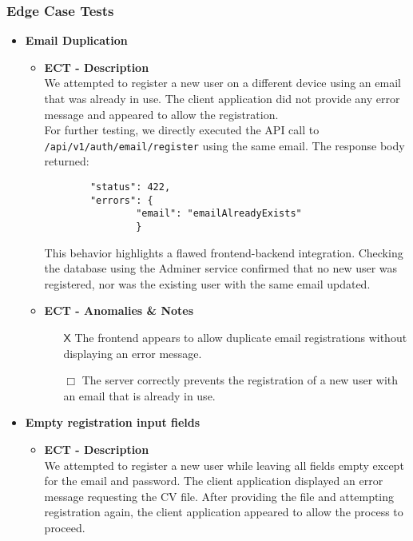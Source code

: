 \subsubsection{Edge Case Tests}
\begin{itemize} [label= {\color{titleColor}\(\diamond\)}]
    \item \textbf{\color{titleColor} Email Duplication }
    \begin{itemize}
        \item \textbf{\color{titleColor} ECT - Description}\\ 
            We attempted to register a new user on a different device using an email that was already in use. The client application did not provide any error message and appeared to allow the registration. \\

            For further testing, we directly executed the API call to \verb|/api/v1/auth/email/register| using the same email. The response body returned:
                \begin{verbatim}
        "status": 422,
        "errors": {
                "email": "emailAlreadyExists"
                }
                \end{verbatim}
            This behavior highlights a flawed frontend-backend integration. Checking the database using the Adminer service confirmed that no new user was registered, nor was the existing user with the same email updated.
            
        \item \textbf{\color{titleColor} ECT - Anomalies \& Notes}\\
        \begin{itemize}
            \item [{\color{titleColor}\(\mathsf{X}\)}] The frontend appears to allow duplicate email registrations without displaying an error message.
            \item [{\color{titleColor}\(\Box \)}] The server correctly prevents the registration of a new user with an email that is already in use.
        \end{itemize} 
    \end{itemize}
    \item \textbf{\color{titleColor} Empty registration input fields}
    \begin{itemize}
        \item \textbf{\color{titleColor} ECT - Description}\\
        We attempted to register a new user while leaving all fields empty except for the email and password. The client application displayed an error message requesting the CV file. After providing the file and attempting registration again, the client application appeared to allow the process to proceed.\\


\end{itemize}
\end{itemize}
